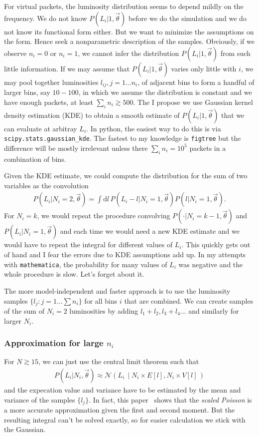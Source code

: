 \documentclass[a4,12pt]{article}
\newcommand{\given}[2]{\left(#1\, \middle| #2 \, \right)}
\newcommand{\gaussian}{\ensuremath{\mathcal{N}}}
\newcommand{\Lumi}{\ensuremath{L_i}}
\newcommand{\rmdx}[1]{\mbox{d} #1 \,} %
\newcommand{\vecth}{\ensuremath{{\vec{\theta}}}}
\begin{document}
For virtual packets, the luminosity distribution seems to depend
mildly on the frequency.  We do not know $P(\Lumi | 1, \vecth)$ before
we do the simulation and we do not know its functional form
either. But we want to minimize the assumptions on the form. Hence
seek a nonparametric description of the samples. Obviously, if we
observe $n_i=0$ or $n_i=1$, we cannot infer the distribution $P(\Lumi
| 1, \vecth)$ from such little information. If we may assume that
$P(\Lumi | 1, \vecth)$ varies only little with $i$, we may pool
together luminosities $l_{ij}, j=1 \dots n_i$, of adjacent bins to
form a handful of larger bins, say $10-100$, in which we assume the
distribution is constant and we have enough packets, at least $\sum_i
n_i \gtrsim 500$. The I propose we use Gaussian kernel density
estimation (KDE) to obtain a smooth estimate of $P(\Lumi | 1, \vecth)$
that we can evaluate at arbitray $\Lumi$. In python, the easiest way
to do this is via \texttt{scipy.stats.gaussian\_kde}. The fastest to
my knowledge is \texttt{figtree} but the difference will be mostly
irrelevant unless there $\sum_i n_i = 10^5$ packets in a combination
of bins.

Given the KDE estimate, we could compute the distribution for the sum
of two variables as the convolution
\begin{align}
  \label{eq:sum-of-2}
  P(\Lumi | N_i=2, \vecth) = \int \rmdx{l} P(\Lumi -l | N_i=1, \vecth) P(l | N_i=1, \vecth).
\end{align}
For $N_i =k$, we would repeat the procedure convolving $P(\cdot |
N_i=k-1, \vecth)$ and $P(\Lumi | N_i=1, \vecth)$ and each time we
would need a new KDE estimate and we would have to repeat the integral
for different values of $\Lumi$. This quickly gets out of hand and I
fear the errors due to KDE assumptions add up. In my attempts with
\texttt{mathematica}, the probability for many values of $\Lumi$ was
negative and the whole procedure is slow. Let's forget about it.

The more model-independent and faster approach is to use the
luminosity samples $\{l_j: j=1 \dots \sum n_i\}$ for all bins $i$ that
are combined. We can create samples of the sum of $N_i=2$ luminosities
by adding $l_1+l_2, l_3 + l_4 \dots$ and similarly for larger
$N_i$.

\subsubsection*{Approximation for large $n_i$}

For $N \gtrsim 15$, we can just use the central limit theorem
such that
\begin{align}
  \label{eq:clt}
  P(\Lumi | N_i, \vecth) \approx \gaussian \given{\Lumi}{N_i \times E[l], N_i \times V[l]}
\end{align}
and the expecation value and variance have to be estimated by the mean
and variance of the samples $\{l_j\}$. In fact, this paper~\cite{bohm_statistics_2014}
shows that the \emph{scaled Poisson} is a more accurate approximation
given the first and second moment. But the resulting integral can't be
solved exactly, so for easier calculation we stick with the Gaussian.
\end{document}
